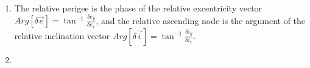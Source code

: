 \documentclass[a4paper]{article}
\begin{document}
\begin{enumerate}[label=\emph{\alph*)}]
  \item %
    The relative perigee is the phase of the relative excentricity vector $Arg[\delta \vec{e}] = \tan^{-1}{\frac{\delta e_y}{\delta e_x}}$, and the relative ascending node is the argument of the relative inclination vector $Arg[\delta \vec{i}]= \tan^{-1}{\frac{\delta i_y}{\delta i_x}}$.


  \item %



\end{enumerate}
\end{document}
